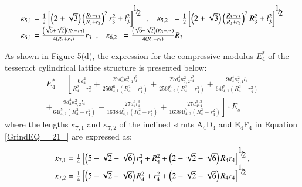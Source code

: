 \documentclass{article} %
\begin{document}
\[\begin{array}{l} {\kappa _{5,1} =\frac{1}{2} \left[\left(2+\sqrt{3} \right)\left(\frac{R_{3} -r_{3} }{R_{3} +r_{3} } \right)^{2} r_{3}^{2} +l_{3}^{2} \right]^{{\raise0.7ex\hbox{$ 1 $}\!\mathord{\left/{\vphantom{1 2}}\right.\kern-\nulldelimiterspace}\!\lower0.7ex\hbox{$ 2 $}} } \begin{array}{cc} {,} & {\kappa _{5,2} } \end{array}=\frac{1}{2} \left[\left(2+\sqrt{3} \right)\left(\frac{R_{3} -r_{3} }{R_{3} +r_{3} } \right)^{2} R_{3}^{2} +l_{3}^{2} \right]^{{\raise0.7ex\hbox{$ 1 $}\!\mathord{\left/{\vphantom{1 2}}\right.\kern-\nulldelimiterspace}\!\lower0.7ex\hbox{$ 2 $}} } } \\ {\kappa _{6,1} =\frac{\left(\sqrt{6} +\sqrt{2} \right)\left(R_{3} -r_{3} \right)}{4\left(R_{3} +r_{3} \right)} r_{3} \begin{array}{cc} {,} & {\kappa _{6,2} } \end{array}=\frac{\left(\sqrt{6} +\sqrt{2} \right)\left(R_{3} -r_{3} \right)}{4\left(R_{3} +r_{3} \right)} R_{3} } \end{array}\] 

As shown in Figure 5(d), the expression for the compressive modulus $E_{4}^{*} $ of the tesseract cylindrical lattice structure is presented below:
\begin{equation} \label{GrindEQ__21_} 
\begin{array}{l} {E_{4}^{*} =\left[\frac{6d_{4}^{2} }{R_{4}^{2} -r_{4}^{2} } +\frac{27d_{4}^{4} \kappa _{7,1}^{2} l_{4}^{2} }{256l_{4,1}^{6} \left(R_{4}^{2} -r_{4}^{2} \right)} +\frac{27d_{4}^{4} \kappa _{7,2}^{2} l_{4}^{2} }{256l_{4,2}^{6} \left(R_{4}^{2} -r_{4}^{2} \right)} +\frac{9d_{4}^{4} \kappa _{7,1}^{2} l_{4} }{64l_{4,1}^{5} \left(R_{4}^{2} -r_{4}^{2} \right)} \right. } \\ {+\frac{9d_{4}^{4} \kappa _{7,2}^{2} l_{4} }{64l_{4,2}^{5} \left(R_{4}^{2} -r_{4}^{2} \right)} +\frac{27d_{4}^{6} l_{4}^{3} }{16384l_{4,1}^{7} \left(R_{4}^{2} -r_{4}^{2} \right)} +\left. \frac{27d_{4}^{6} l_{4}^{3} }{16384l_{4,2}^{7} \left(R_{4}^{2} -r_{4}^{2} \right)} \right]\cdot E_{s} } \end{array} 
\end{equation} 
where the lengths $\kappa _{7,1} $ and $\kappa _{7,2} $ of the inclined struts A${}_{4}$D${}_{4}$ and E${}_{4}$F${}_{4}$ in Equation \eqref{GrindEQ__21_} are expressed as:
\[\begin{array}{l} {\kappa _{7,1} =\frac{1}{4} \left[\left(5-\sqrt{2} -\sqrt{6} \right)r_{4}^{2} +R_{4}^{2} +\left(2-\sqrt{2} -\sqrt{6} \right)R_{4} r_{4} \right]^{{\raise0.7ex\hbox{$ 1 $}\!\mathord{\left/{\vphantom{1 2}}\right.\kern-\nulldelimiterspace}\!\lower0.7ex\hbox{$ 2 $}} } ,} \\ {\kappa _{7,2} =\frac{1}{4} \left[\left(5-\sqrt{2} -\sqrt{6} \right)R_{4}^{2} +r_{4}^{2} +\left(2-\sqrt{2} -\sqrt{6} \right)R_{4} r_{4} \right]^{{\raise0.7ex\hbox{$ 1 $}\!\mathord{\left/{\vphantom{1 2}}\right.\kern-\nulldelimiterspace}\!\lower0.7ex\hbox{$ 2 $}} } } \end{array}\] 
\end{document}
